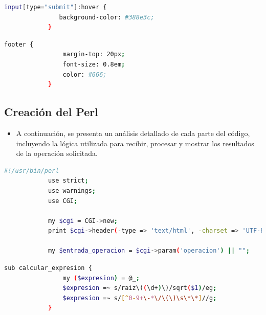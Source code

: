 \documentclass{article}
\begin{document}
        \begin{lstlisting}[language=bash,caption={Cambia el color de fondo a un verde más oscuro cuando el cursor está sobre el botón}, label={lst:color-boton}]
            input[type="submit"]:hover {
               background-color: #388e3c;
            }
        \end{lstlisting} 
        
        \begin{lstlisting}[language=bash,caption={Este le dara un estilo para el pie de página}, label={lst:color-boton}]
            footer {
                margin-top: 20px;
                font-size: 0.8em;
                color: #666;
            }
        \end{lstlisting}	
		
	\subsection{Creación del Perl}
        \begin{itemize}
            \item A continuación, se presenta un análisis detallado de cada parte del código, incluyendo la lógica utilizada para recibir, procesar y mostrar los resultados de la operación solicitada.
        \end{itemize}

        \begin{lstlisting}[language=bash,caption={Este fragmento muestra la configuración básica para iniciar el script CGI y preparar el entorno para recibir una operación desde la interfaz web.}, label={lst:color-boton}] 
            #!/usr/bin/perl
            use strict;
            use warnings;
            use CGI;
            
            my $cgi = CGI->new;
            print $cgi->header(-type => 'text/html', -charset => 'UTF-8');

            my $entrada_operacion = $cgi->param('operacion') || "";

        \end{lstlisting}	

        \begin{lstlisting}[language=bash,caption={Aquí se utiliza una expresión regular para validar y limpiar la entrada del usuario, permitiendo solo números, operadores aritméticos, paréntesis, y el operador de potencia **.}, label={lst:color-boton}]
            sub calcular_expresion {
                my ($expresion) = @_;
                $expresion =~ s/raiz\((\d+)\)/sqrt($1)/eg;
                $expresion =~ s/[^0-9+\-*\/\(\)\s\*\*]//g;
            }

        \end{lstlisting}
\end{document}
